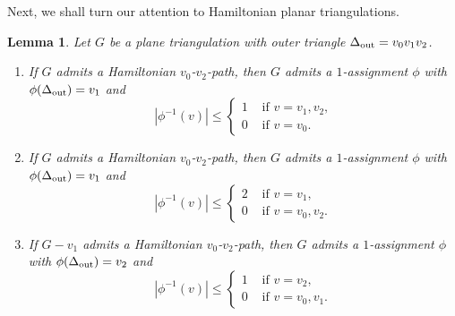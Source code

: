 \documentclass[a4paper,10pt]{article}
\theoremstyle{plain}
\newtheorem{lem}[thm]{Lemma}
\begin{document}
Next, we shall turn our attention to Hamiltonian planar triangulations.


\begin{lem}\label{lem:1-assignment}
 Let $G$ be a plane triangulation with outer triangle $\Delta_{\rm out} = v_0v_1v_2$.
 \begin{enumerate}[label = (\roman*)]
  \item If $G$ admits a Hamiltonian $v_0$-$v_2$-path, then $G$ admits a $1$-assignment $\phi$ with $\phi(\Delta_{\rm out}) = v_1$ and 
  \[
   |\phi^{-1}(v)| \leq 
    \begin{cases}
     1 & \text{ if $v = v_1,v_2$,}\\
     0 & \text{ if $v = v_0$.}
    \end{cases}
  \]
  \label{item:assign-v_1-and-split}
  
  \item If $G$ admits a Hamiltonian $v_0$-$v_2$-path, then $G$ admits a $1$-assignment $\phi$ with $\phi(\Delta_{\rm out}) = v_1$ and 
  \[
   |\phi^{-1}(v)| \leq 
    \begin{cases}
     2 & \text{ if $v = v_1$,}\\
     0 & \text{ if $v = v_0,v_2$.}
    \end{cases}
  \]
  \label{item:assign-v_1-and-both}
  
  \item If $G - v_1$ admits a Hamiltonian $v_0$-$v_2$-path, then $G$ admits a $1$-assignment $\phi$ with $\phi(\Delta_{\rm out}) = v_2$ and 
  \[
   |\phi^{-1}(v)| \leq 
    \begin{cases}
     1 & \text{ if $v = v_2$,}\\
     0 & \text{ if $v = v_0,v_1$.}
    \end{cases}
  \]
  \label{item:assign-v_2}
 \end{enumerate}
\end{lem}
% 
\end{document}
